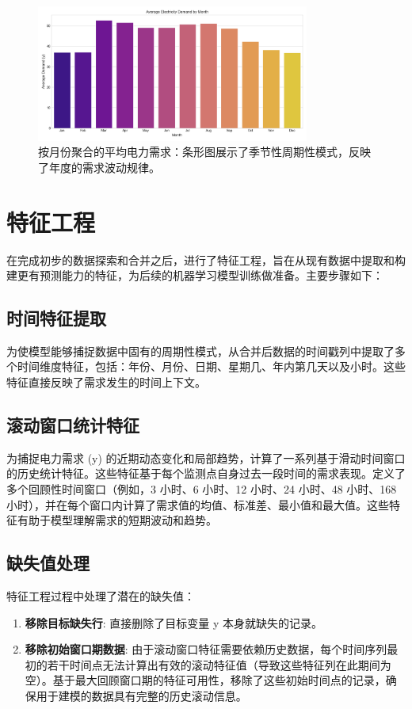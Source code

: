 \documentclass{article} %
\begin{document}
\begin{figure}[H]
    \centering
    \includegraphics[width=0.8\textwidth]{../plots/avg_demand_by_month_spark.png}
    \caption{按月份聚合的平均电力需求：条形图展示了季节性周期性模式，反映了年度的需求波动规律。} %
    \label{fig:demand_by_month}
\end{figure}

\section{特征工程}
\label{sec:feature_engineering}

在完成初步的数据探索和合并之后，进行了特征工程，旨在从现有数据中提取和构建更有预测能力的特征，为后续的机器学习模型训练做准备。主要步骤如下：

\subsection{时间特征提取}
\label{subsec:time_features}
为使模型能够捕捉数据中固有的周期性模式，从合并后数据的时间戳列中提取了多个时间维度特征，包括：年份、月份、日期、星期几、年内第几天以及小时。这些特征直接反映了需求发生的时间上下文。

\subsection{滚动窗口统计特征}
\label{subsec:rolling_features}
为捕捉电力需求 (y) 的近期动态变化和局部趋势，计算了一系列基于滑动时间窗口的历史统计特征。这些特征基于每个监测点自身过去一段时间的需求表现。定义了多个回顾性时间窗口（例如，3 小时、6 小时、12 小时、24 小时、48 小时、168 小时），并在每个窗口内计算了需求值的均值、标准差、最小值和最大值。这些特征有助于模型理解需求的短期波动和趋势。

\subsection{缺失值处理}
\label{subsec:fe_missing_values}
特征工程过程中处理了潜在的缺失值：
\begin{enumerate}
    \item \textbf{移除目标缺失行}: 直接删除了目标变量 y 本身就缺失的记录。
    \item \textbf{移除初始窗口期数据}: 由于滚动窗口特征需要依赖历史数据，每个时间序列最初的若干时间点无法计算出有效的滚动特征值（导致这些特征列在此期间为空）。基于最大回顾窗口期的特征可用性，移除了这些初始时间点的记录，确保用于建模的数据具有完整的历史滚动信息。
\end{enumerate}
\end{document}
